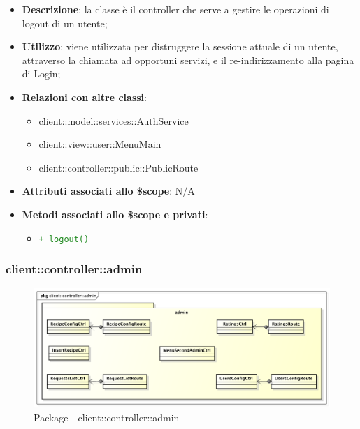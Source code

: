 			\begin{itemize}
				\item \textbf{Descrizione}: la classe è il controller che serve a gestire le operazioni di logout di un utente;
				\item \textbf{Utilizzo}: viene utilizzata per distruggere la sessione attuale di un utente, attraverso la chiamata ad opportuni servizi, e il re-indirizzamento alla pagina di Login;
				\item \textbf{Relazioni con altre classi}:
					\begin{itemize}
						\item client::model::services::AuthService
						\item client::view::user::MenuMain
						\item client::controller::public::PublicRoute
					\end{itemize}
				\item \textbf{Attributi associati allo \$scope}: N/A
				\item \textbf{Metodi associati allo \$scope e privati}:
					\begin{itemize}
						\item \textcolor{forestgreen}{\texttt{+ logout()}}
					\end{itemize}
			\end{itemize}



\subsubsection{client::controller::admin} %
\label{ssub:bdsm_app_client_controller_admin}
\begin{figure}[htbp]
	\centering
	\centerline{\includegraphics[scale=0.45]{./images/client/client_controller_admin.pdf}}
	\caption{Package - client::controller::admin}
\end{figure}

